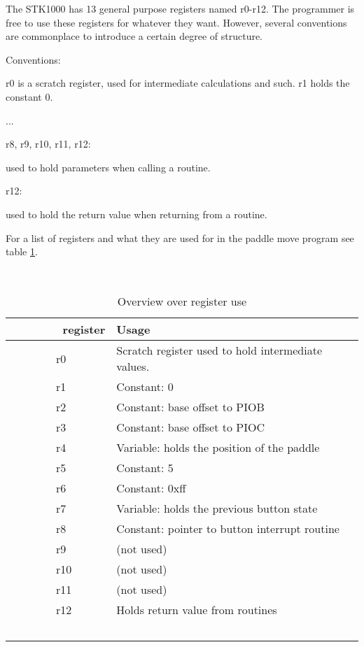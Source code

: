 The STK1000 has 13 general purpose registers named r0-r12. The programmer is free to use these registers for whatever they want.
However, several conventions are commonplace to introduce a certain degree of structure.

Conventions:

r0 is a scratch register, used for intermediate calculations and such.
r1 holds the constant 0.

...

r8, r9, r10, r11, r12:

used to hold parameters when calling a routine.

r12:

used to hold the return value when returning from a routine.


For a list of registers and what they are used for in the paddle move program see table \ref{register-table}.

\begin{table}
    \centering
    \begin{tabular}{|l|l|}
        \hline
        register  & Usage \\
        \hline
        \hline
        r0  & Scratch register used to hold intermediate values. \\
        \hline
        r1  & Constant: 0 \\ 
        \hline
        r2  & Constant: base offset to PIOB \\ 
        \hline
        r3  & Constant: base offset to PIOC \\ 
        \hline
        r4  & Variable: holds the position of the paddle \\ 
        \hline
        r5  & Constant: 5 \\ 
        \hline
        r6  & Constant: 0xff \\ 
        \hline
        r7  & Variable: holds the previous button state \\ 
        \hline
        r8  & Constant: pointer to button interrupt routine \\ 
        \hline
        r9  & (not used) \\ 
        \hline
        r10 & (not used) \\ 
        \hline
        r11 & (not used) \\ 
        \hline
        r12 & Holds return value from routines \\
        \hline
    \end{tabular}
    \caption{Overview over register use}
    \label{register-table}
\end{table}
